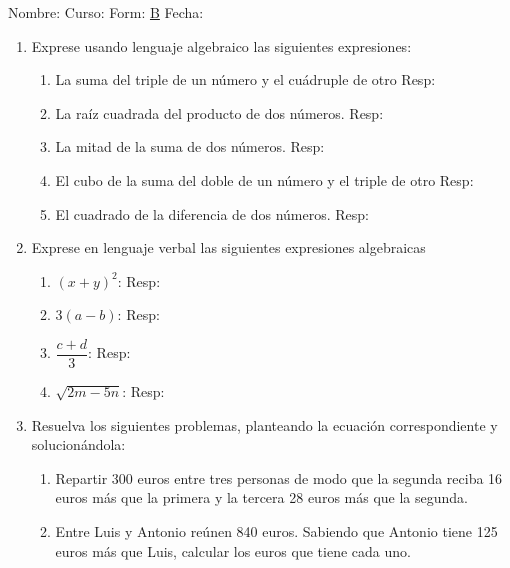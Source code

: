 \documentclass[letterpaper,fleqn]{article}
\newcommand{\LineaNombre}{%
\par
\vspace{\baselineskip}
Nombre:\hrulefill \; Curso: \underline{\hspace*{48pt}} \; Form: \underline{B} \; Fecha: \underline{\hspace*{2.5cm}} \relax
\par}
\begin{document}
\LineaNombre
\begin{enumerate}
 \item Exprese usando lenguaje algebraico las siguientes expresiones:
 \begin{enumerate}
  \item La suma del triple de un número y el cuádruple de otro \hspace{1cm} Resp: \hrulefill
  \item La raíz cuadrada del producto de dos números. \hspace{1cm} Resp: \hrulefill
  \item La mitad de la suma de dos números. \hspace{1cm} Resp: \hrulefill
  \item El cubo de la suma del doble de un número y el triple de otro \hspace{1cm} Resp: \hrulefill
  \item El cuadrado de la diferencia de dos números. \hspace{1cm} Resp: \hrulefill 
 \end{enumerate}
\item Exprese en lenguaje verbal las siguientes expresiones algebraicas
\begin{enumerate}
 \item $(x+y)^{2}$:\hspace{1cm} Resp: \hrulefill
 \item $3(a-b)$: \hspace{1cm} Resp: \hrulefill
 \item $\dfrac{c+d}{3}$:\hspace{1cm} Resp: \hrulefill
 \item $\sqrt{2m-5n}$:\hspace{1cm} Resp: \hrulefill
\end{enumerate}
\item Resuelva los siguientes problemas, planteando la ecuación correspondiente y solucionándola:
\begin{enumerate}
  \item Repartir 300 euros entre tres personas de modo que la segunda reciba 16 euros más que la primera y la tercera 28 euros más que la segunda. \noanswer
   \item  Entre Luis y Antonio reúnen 840 euros. Sabiendo que Antonio tiene 125 euros más que Luis, calcular los euros que tiene cada uno. \noanswer

\end{enumerate}
\end{enumerate}
\end{document}

